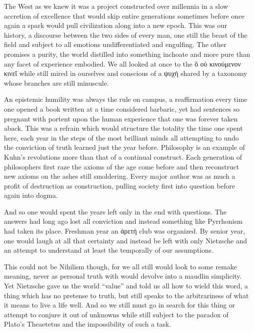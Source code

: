 \documentclass[ebook, 10pt, openright, onecolumn]{memoir}
\newcommand{\textgreek}[1]{\begingroup\fontencoding{LGR}\selectfont#1\endgroup}
\begin{document}
The West as we knew it was a project constructed over millennia in a slow
accretion of excellence that would skip entire generations sometimes before once
again a spark would pull civilization along into a new epoch.  This was our
history, a discourse between the two sides of every man, one still the beast of
the field and subject to all emotions undifferentiated and engulfing.  The other
promises a purity, the world distilled into something inchoate and more pure
than any facet of experience embodied.  We all looked at once to the
\textgreek{ὃ οὐ κινούμενον κινεῖ} while still mired in ourselves and conscious
of a \textgreek{ψυχή} shared by a taxonomy whose branches are still minuscule. 

An epistemic humility was always the rule on campus, a reaffirmation every time
one opened a book written at a time considered barbaric, yet had sentences so
pregnant with portent upon the human experience that one was forever taken
aback.  This was a refrain which would structure the totality the time one spent
here, each year in the steps of the most brilliant minds all attempting to undo
the conviction of truth learned just the year before.  Philosophy is an example
of Kuhn's revolutions more than that of a continual construct.  Each generation
of philosophers first raze the axioms of the age come before and then
reconstruct new axioms on the ashes still smoldering.  Every major author was as
much a profit of destruction as construction, pulling society first into
question before again into dogma.

And so one would spent the years left only in the end with questions.  The
answers had long ago lost all conviction and instead something like Pyrrhonism
had taken its place.  Freshman year an \textgreek{ἀρετή} club was organized.  By
senior year, one would laugh at all that certainty and instead be left with only
Nietzsche and an attempt to understand at least the temporally of our
assumptions.

This could not be Nihilism though, for we all still would look to some remake
meaning, never as personal truth with would devolve into a maudlin simplicity.
Yet Nietzsche gave us the world ``value'' and told us all how to wield this
word, a thing which has no pretense to truth, but still speaks to the
arbitrariness of what it means to live a life well.  And so we still must go in
search for this thing or attempt to conjure it out of unknowns while still
subject to the paradox of Plato's Theaetetus and the impossibility of such a
task.
\end{document}
